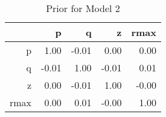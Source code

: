 \begin{table}[ht]
\centering
\begin{tabular}{rrrrr}
  \hline
 & p & q & z & rmax \\ 
  \hline
p & 1.00 & -0.01 & 0.00 & 0.00 \\ 
  q & -0.01 & 1.00 & -0.01 & 0.01 \\ 
  z & 0.00 & -0.01 & 1.00 & -0.00 \\ 
  rmax & 0.00 & 0.01 & -0.00 & 1.00 \\ 
   \hline
\end{tabular}
\caption{Prior for Model 2} 
\label{tab:param_correlations_prior_model_2}
\end{table}

